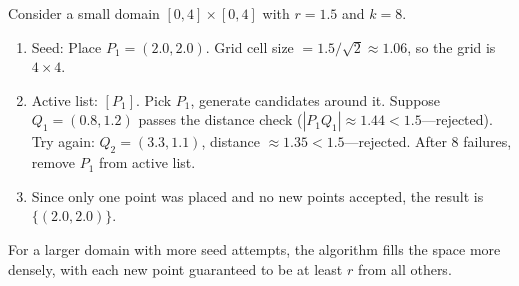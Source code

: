 

\begin{example}\label{ex:poisson_disk_trace}
Consider a small domain $[0, 4] \times [0, 4]$ with $r = 1.5$ and $k = 8$.
\begin{enumerate}
    \item Seed: Place $P_1 = (2.0, 2.0)$. Grid cell size $= 1.5/\sqrt{2} \approx 1.06$, so the grid is $4 \times 4$.
    \item Active list: $[P_1]$. Pick $P_1$, generate candidates around it. Suppose $Q_1 = (0.8, 1.2)$ passes the distance check ($|P_1 Q_1| \approx 1.44 < 1.5$---rejected). Try again: $Q_2 = (3.3, 1.1)$, distance $\approx 1.35 < 1.5$---rejected. After 8 failures, remove $P_1$ from active list.
    \item Since only one point was placed and no new points accepted, the result is $\{(2.0, 2.0)\}$.
\end{enumerate}
For a larger domain with more seed attempts, the algorithm fills the space more densely, with each new point guaranteed to be at least $r$ from all others.
\end{example}

